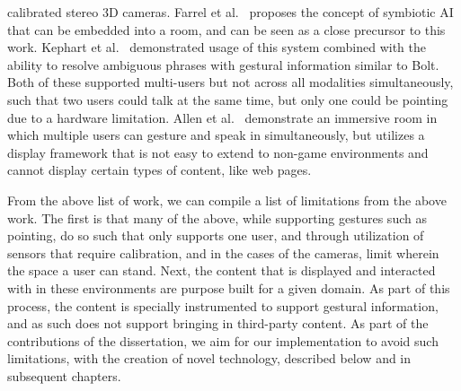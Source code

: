 calibrated stereo 3D cameras. Farrel et al.~\cite{farrell_symbiotic_2016}
proposes the concept of symbiotic AI that can be embedded into a room, and
can be seen as a close precursor to this work. Kephart et 
al.~\cite{kephart_embodied_2019} demonstrated usage of this system combined
with the ability to resolve ambiguous phrases with gestural information similar
to Bolt. Both of these supported multi-users but not across all modalities
simultaneously, such that two users could talk at the same time, but only one
could be pointing due to a hardware limitation. Allen et 
al.~\cite{allen_rensselaer_2019} demonstrate an immersive room in which multiple
users can gesture and speak in simultaneously, but utilizes a display framework
that is not easy to extend to non-game environments and cannot display certain
types of content, like web pages.

From the above list of work, we can compile a list of limitations from the above
work. The first is that many of the above, while supporting gestures such as
pointing, do so such that only supports one user, and through utilization of
sensors that require calibration, and in the cases of the cameras, limit wherein
the space a user can stand. Next, the content that is displayed and interacted
with in these environments are purpose built for a given domain. As part of this
process, the content is specially instrumented to support gestural information,
and as such does not support bringing in third-party content. As part of the
contributions of the dissertation, we aim for our implementation to avoid such
limitations, with the creation of novel technology, described below and in
subsequent chapters.